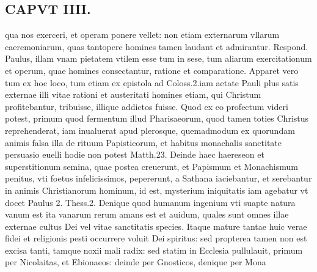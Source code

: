 \documentclass{article}
\begin{document}
\begin{pages}
\section*{CAPVT  IIII. }
\marginpar{[ p.207 ]}\pstart qua nos exerceri, et operam ponere vellet: non etiam externarum vllarum caeremoniarum, quas tantopere homines tamen laudant et admirantur. Respond. Paulus, illam vnam pietatem vtilem esse tum in sese, tum aliarum exercitationum et operum, quae homines consectantur, ratione et comparatione. Apparet vero tum ex hoc loco, tum etiam ex epistola ad Coloss.2.iam aetate Pauli plus satis externae illi vitae rationi et austeritati homines etiam, qui Christum profitebantur, tribuisse, illique addictos fuisse. Quod ex eo profectum videri potest, primum quod fermentum illud Pharisaeorum, quod tamen toties Christus reprehenderat, iam inualuerat apud plerosque, quemadmodum ex quorundam animis falsa illa de rituum Papisticorum, et habitus monachalis sanctitate persuasio euelli hodie non potest Matth.23. Deinde haec haereseon et superstitionum semina, quae postea creuerunt, et Papismum et Monachismum penitus, vti foetus infelicissimos, pepererunt, a Sathana iaciebantur, et serebantur in animis Christianorum hominum, id est, mysterium iniquitatis iam agebatur vt docet Paulus 2. Thess.2. Denique quod humanum ingenium vti suapte natura vanum est ita vanarum rerum amans est et auidum, quales sunt omnes illae externae cultus Dei vel vitae sanctitatis species. Itaque mature tantae huic verae fidei et religionis pesti occurrere voluit Dei spiritus: sed propterea tamen non est excisa tanti, tamque noxii mali radix: sed statim in Ecclesia pullulauit, primum per Nicolaitas, et Ebionaeos: deinde per Gnosticos, denique per Mona\pend

\end{pages}
\end{document}
